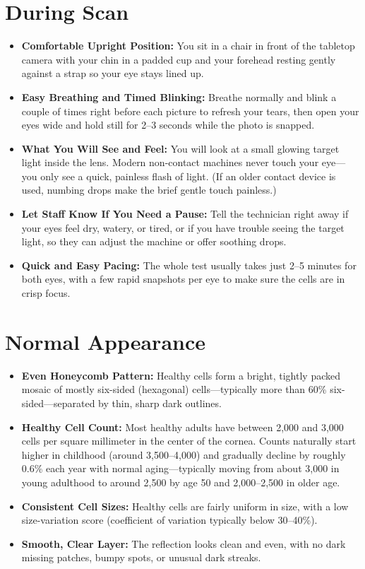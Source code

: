 \section{During Scan}

\begin{itemize}
    \item \textbf{Comfortable Upright Position:} You sit in a chair in front of the tabletop camera with your chin in a padded cup and your forehead resting gently against a strap so your eye stays lined up.
    \item \textbf{Easy Breathing and Timed Blinking:} Breathe normally and blink a couple of times right before each picture to refresh your tears, then open your eyes wide and hold still for 2--3 seconds while the photo is snapped.
    \item \textbf{What You Will See and Feel:} You will look at a small glowing target light inside the lens. Modern non-contact machines never touch your eye---you only see a quick, painless flash of light. (If an older contact device is used, numbing drops make the brief gentle touch painless.)
    \item \textbf{Let Staff Know If You Need a Pause:} Tell the technician right away if your eyes feel dry, watery, or tired, or if you have trouble seeing the target light, so they can adjust the machine or offer soothing drops.
    \item \textbf{Quick and Easy Pacing:} The whole test usually takes just 2--5 minutes for both eyes, with a few rapid snapshots per eye to make sure the cells are in crisp focus.
\end{itemize}

\section{Normal Appearance}

\begin{itemize}
    \item \textbf{Even Honeycomb Pattern:} Healthy cells form a bright, tightly packed mosaic of mostly six-sided (hexagonal) cells---typically more than 60\% six-sided---separated by thin, sharp dark outlines.
    \item \textbf{Healthy Cell Count:} Most healthy adults have between 2,000 and 3,000 cells per square millimeter in the center of the cornea. Counts naturally start higher in childhood (around 3,500--4,000) and gradually decline by roughly 0.6\% each year with normal aging---typically moving from about 3,000 in young adulthood to around 2,500 by age 50 and 2,000--2,500 in older age.
    \item \textbf{Consistent Cell Sizes:} Healthy cells are fairly uniform in size, with a low size-variation score (coefficient of variation typically below 30--40\%).
    \item \textbf{Smooth, Clear Layer:} The reflection looks clean and even, with no dark missing patches, bumpy spots, or unusual dark streaks.
\end{itemize}

